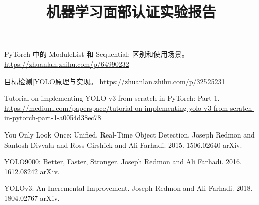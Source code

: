\documentclass[11pt]{article} %
\title{机器学习面部认证实验报告}
\author{}
\date{} %
\begin{document}
\maketitle






\begin{thebibliography}{99}
 PyTorch 中的 ModuleList 和 Sequential: 区别和使用场景。 \href{https://zhuanlan.zhihu.com/p/64990232}{https://zhuanlan.zhihu.com/p/64990232}

 目标检测|YOLO原理与实现。 \href{https://zhuanlan.zhihu.com/p/32525231}{https://zhuanlan.zhihu.com/p/32525231}

 Tutorial on implementing YOLO v3 from scratch in PyTorch: Part 1. \href{https://medium.com/paperspace/tutorial-on-implementing-yolo-v3-from-scratch-in-pytorch-part-1-a0054d38ec78}{https://medium.com/paperspace/tutorial-on-implementing-yolo-v3-from-scratch-in-pytorch-part-1-a0054d38ec78}

You Only Look Once: Unified, Real-Time Object Detection. Joseph Redmon and Santosh Divvala and Ross Girshick and Ali Farhadi. 2015. 1506.02640 arXiv.

YOLO9000: Better, Faster, Stronger. Joseph Redmon and Ali Farhadi. 2016. 1612.08242 arXiv.

YOLOv3: An Incremental Improvement. Joseph Redmon and Ali Farhadi. 2018. 1804.02767 arXiv.
\end{thebibliography}
\end{document}
